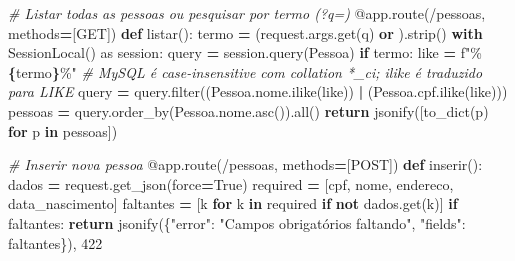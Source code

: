 \documentclass[
]{book}
\newenvironment{Shaded}{\begin{snugshade}}{\end{snugshade}}
\newcommand{\AttributeTok}[1]{\textcolor[rgb]{0.13,0.29,0.53}{#1}}
\newcommand{\BuiltInTok}[1]{#1}
\newcommand{\CommentTok}[1]{\textcolor[rgb]{0.56,0.35,0.01}{\textit{#1}}}
\newcommand{\ControlFlowTok}[1]{\textcolor[rgb]{0.13,0.29,0.53}{\textbf{#1}}}
\newcommand{\DecValTok}[1]{\textcolor[rgb]{0.00,0.00,0.81}{#1}}
\newcommand{\ImportTok}[1]{#1}
\newcommand{\KeywordTok}[1]{\textcolor[rgb]{0.13,0.29,0.53}{\textbf{#1}}}
\newcommand{\NormalTok}[1]{#1}
\newcommand{\OperatorTok}[1]{\textcolor[rgb]{0.81,0.36,0.00}{\textbf{#1}}}
\newcommand{\SpecialCharTok}[1]{\textcolor[rgb]{0.81,0.36,0.00}{\textbf{#1}}}
\newcommand{\SpecialStringTok}[1]{\textcolor[rgb]{0.31,0.60,0.02}{#1}}
\newcommand{\StringTok}[1]{\textcolor[rgb]{0.31,0.60,0.02}{#1}}
\newcommand{\VariableTok}[1]{\textcolor[rgb]{0.00,0.00,0.00}{#1}}
\begin{document}
\begin{Shaded}
\begin{Highlighting}[]
\CommentTok{\# Listar todas as pessoas ou pesquisar por termo (?q=)}
\AttributeTok{@app.route}\NormalTok{(}\StringTok{\textquotesingle{}/pessoas\textquotesingle{}}\NormalTok{, methods}\OperatorTok{=}\NormalTok{[}\StringTok{\textquotesingle{}GET\textquotesingle{}}\NormalTok{])}
\KeywordTok{def}\NormalTok{ listar():}
\NormalTok{    termo }\OperatorTok{=}\NormalTok{ (request.args.get(}\StringTok{\textquotesingle{}q\textquotesingle{}}\NormalTok{) }\KeywordTok{or} \StringTok{\textquotesingle{}\textquotesingle{}}\NormalTok{).strip()}
    \ControlFlowTok{with}\NormalTok{ SessionLocal() }\ImportTok{as}\NormalTok{ session:}
\NormalTok{        query }\OperatorTok{=}\NormalTok{ session.query(Pessoa)}
        \ControlFlowTok{if}\NormalTok{ termo:}
\NormalTok{            like }\OperatorTok{=} \SpecialStringTok{f"\%}\SpecialCharTok{\{}\NormalTok{termo}\SpecialCharTok{\}}\SpecialStringTok{\%"}
            \CommentTok{\# MySQL é case{-}insensitive com collation *\_ci; ilike é traduzido para LIKE}
\NormalTok{            query }\OperatorTok{=}\NormalTok{ query.}\BuiltInTok{filter}\NormalTok{((Pessoa.nome.ilike(like)) }\OperatorTok{|}\NormalTok{ (Pessoa.cpf.ilike(like)))}
\NormalTok{        pessoas }\OperatorTok{=}\NormalTok{ query.order\_by(Pessoa.nome.asc()).}\BuiltInTok{all}\NormalTok{()}
        \ControlFlowTok{return}\NormalTok{ jsonify([to\_dict(p) }\ControlFlowTok{for}\NormalTok{ p }\KeywordTok{in}\NormalTok{ pessoas])}

\CommentTok{\# Inserir nova pessoa}
\AttributeTok{@app.route}\NormalTok{(}\StringTok{\textquotesingle{}/pessoas\textquotesingle{}}\NormalTok{, methods}\OperatorTok{=}\NormalTok{[}\StringTok{\textquotesingle{}POST\textquotesingle{}}\NormalTok{])}
\KeywordTok{def}\NormalTok{ inserir():}
\NormalTok{    dados }\OperatorTok{=}\NormalTok{ request.get\_json(force}\OperatorTok{=}\VariableTok{True}\NormalTok{)}
\NormalTok{    required }\OperatorTok{=}\NormalTok{ [}\StringTok{\textquotesingle{}cpf\textquotesingle{}}\NormalTok{, }\StringTok{\textquotesingle{}nome\textquotesingle{}}\NormalTok{, }\StringTok{\textquotesingle{}endereco\textquotesingle{}}\NormalTok{, }\StringTok{\textquotesingle{}data\_nascimento\textquotesingle{}}\NormalTok{]}
\NormalTok{    faltantes }\OperatorTok{=}\NormalTok{ [k }\ControlFlowTok{for}\NormalTok{ k }\KeywordTok{in}\NormalTok{ required }\ControlFlowTok{if} \KeywordTok{not}\NormalTok{ dados.get(k)]}
    \ControlFlowTok{if}\NormalTok{ faltantes:}
        \ControlFlowTok{return}\NormalTok{ jsonify(\{}\StringTok{"error"}\NormalTok{: }\StringTok{"Campos obrigatórios faltando"}\NormalTok{, }\StringTok{"fields"}\NormalTok{: faltantes\}), }\DecValTok{422}


\end{Highlighting}
\end{Shaded}
\end{document}
